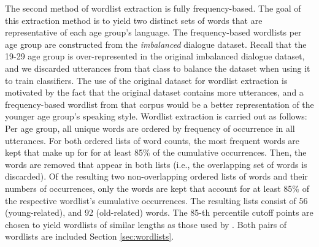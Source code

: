 The second method of wordlist extraction is fully frequency-based.
The goal of this extraction method is to yield two distinct sets of words that are representative of each age group's language. The frequency-based wordlists per age group are constructed from the \textit{imbalanced} dialogue dataset. Recall that the 19-29 age group is over-represented in the original imbalanced dialogue dataset, and we discarded utterances from that class to balance the dataset when using it to train classifiers. The use of the original dataset for wordlist extraction is motivated by the fact that the original dataset contains more utterances, and a frequency-based wordlist from that corpus would be a better representation of the younger age group's speaking style.
Wordlist extraction is carried out as follows: Per age group, all unique words are ordered by frequency of occurrence in all utterances. For both ordered lists of word counts, the most frequent words are kept that make up for for at least 85\% of the cumulative occurrences.
Then, the words are removed that appear in both lists (i.e., the overlapping set of words is discarded). Of the resulting two non-overlapping ordered lists of words and their numbers of occurrences, only the words are kept that account for at least 85\% of the respective wordlist's cumulative occurrences. The resulting lists consist of 56 (young-related), and 92 (old-related) words. The 85-th percentile cutoff points are chosen to yield wordlists of similar lengths as those used by \cite{dathathri2019plug}. Both pairs of wordlists are included Section \ref{sec:wordlists}.



